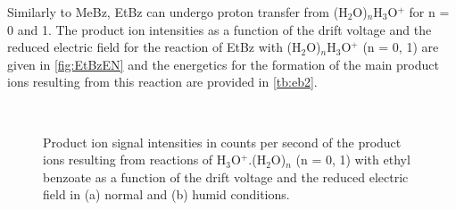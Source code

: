 Similarly to MeBz, EtBz can undergo proton transfer from (H$_2$O)$_n$H$_3$O$^+$ for n = 0 and 1.
%
The product ion intensities as a function of the drift voltage and the reduced electric field for the reaction of EtBz with (H$_2$O)$_n$H$_3$O$^+$ (n = 0, 1) are given in \autoref{fig:EtBzEN} and the energetics for the formation of the main product ions resulting from this reaction are provided in \autoref{tb:eb2}. 

\begin{figure}[htbp]
\centering
{}\\
\caption{Product ion signal intensities in counts per second of the product ions resulting from reactions of H$_3$O$^+$.(H$_2$O)$_n$ (n = 0, 1) with ethyl benzoate as a function of the drift voltage and the reduced electric field in (a) normal and (b) humid conditions.}
\label{fig:EtBzEN}
\end{figure}


